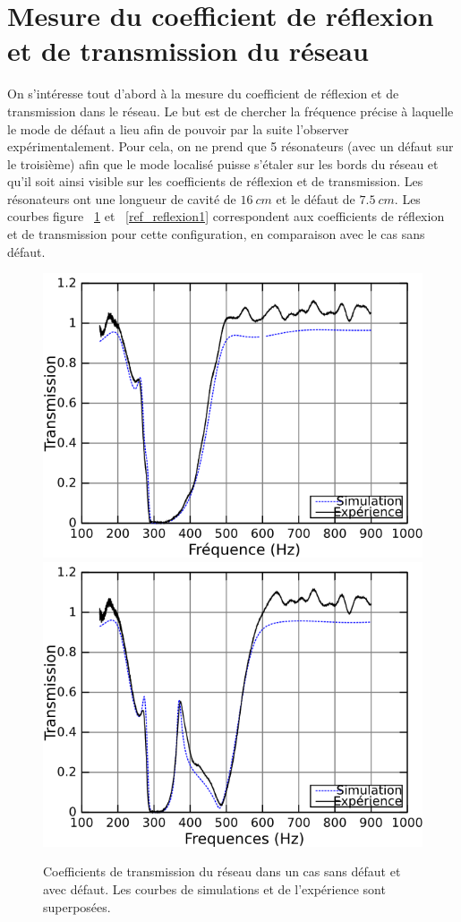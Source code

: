 \section{Mesure du coefficient de réflexion et de transmission du réseau}
On s'intéresse tout d'abord à la mesure du coefficient de réflexion et de transmission dans le réseau. Le but est de chercher la fréquence précise à laquelle le mode de défaut a lieu afin de pouvoir par la suite l'observer expérimentalement. Pour cela, on ne prend que 5 résonateurs (avec un défaut sur le troisième) afin que le mode localisé puisse s'étaler sur les bords du réseau et qu'il soit ainsi visible sur les coefficients de réflexion et de transmission. Les résonateurs ont une longueur de cavité de $16~cm$ et le défaut de $7.5~cm$. Les courbes figure ~\ref{ref_trans1} et ~\ref{ref_reflexion1} correspondent aux coefficients de réflexion et de transmission pour cette configuration, en comparaison avec le cas sans défaut.

\begin{figure}[!h]
\centering
\includegraphics[scale=0.3]{images_chp3/T_5HR165_nodefect.png}
\includegraphics[scale=0.3]{images_chp3/T_5HR165_8cm_pos3.png}
\caption{\label{ref_trans1} Coefficients de transmission du réseau dans un cas sans défaut et avec défaut. Les courbes de simulations et de l’expérience sont superposées.}
\end{figure}

